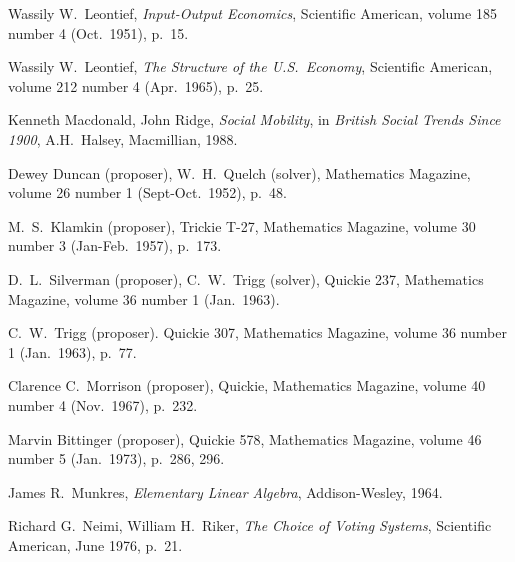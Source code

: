 \begin{thebibliography}{\makebox[2em][c]{{}\hfil{}}}
  Wassily W.\ Leontief,
  \emph{Input-Output Economics},
  Scientific American,
  volume 185 number 4 (Oct.\ 1951),
  p.~15. 

  Wassily W.\ Leontief,
  \emph{The Structure of the U.S.\ Economy},
  Scientific American,
  volume 212 number 4 (Apr.\ 1965),
  p.~25. 


  Kenneth Macdonald, John Ridge,
  \emph{Social Mobility},
  in \emph{British Social Trends Since 1900},
  A.H.~Halsey,
  Macmillian, 1988.


  Dewey Duncan (proposer), W.\ H.\ Quelch (solver),
  Mathematics Magazine,
  volume 26 number 1 (Sept-Oct.\ 1952),
  p.~48.

  M.\ S.\ Klamkin (proposer),
  Trickie T-27,
  Mathematics Magazine,
  volume 30 number 3 (Jan-Feb.\ 1957),
  p.~173.

  D.\ L.\ Silverman (proposer), C.\ W.\ Trigg (solver),
  Quickie 237,
  Mathematics Magazine,
  volume 36 number 1 (Jan.\ 1963).

  C.\ W.\ Trigg (proposer).
  Quickie 307,
  Mathematics Magazine,
  volume 36 number 1 (Jan.\ 1963),
  p.~77.

  Clarence C.\ Morrison (proposer),
  Quickie,
  Mathematics Magazine,
  volume 40 number 4 (Nov.\ 1967),
  p.~232.

  Marvin Bittinger (proposer),
  Quickie 578,
  Mathematics Magazine,
  volume 46 number 5 (Jan.\ 1973),
  p.~286, 296.

  James R.\ Munkres,
  \emph{Elementary Linear Algebra},
  Addison-Wesley,
  1964.

  Richard G.~Neimi, William H.~Riker,
  \emph{The Choice of Voting Systems},
  Scientific American,
  June 1976,
  p.~21.


\end{thebibliography}
